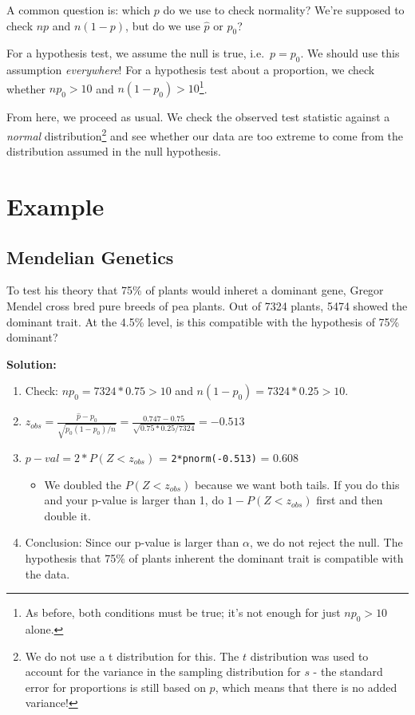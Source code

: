 \documentclass[
  letterpaper,
  DIV=11,
  numbers=noendperiod,
  oneside]{scrreprt}
\providecommand{\tightlist}{%
  \setlength{\itemsep}{0pt}\setlength{\parskip}{0pt}}\usepackage{longtable,booktabs,array}
\begin{document}
A common question is: which \(p\) do we use to check normality? We're
supposed to check \(np\) and \(n(1-p)\), but do we use \(\hat p\) or
\(p_0\)?

For a hypothesis test, we assume the null is true, i.e.~\(p=p_0\). We
should use this assumption \emph{everywhere}! For a hypothesis test
about a proportion, we check whether \(np_0>10\) and
\(n(1-p_0)>10\)\footnote{As before, both conditions must be true; it's
  not enough for just \(np_0>10\) alone.}.

From here, we proceed as usual. We check the observed test statistic
against a \emph{normal} distribution\footnote{We do not use a t
  distribution for this. The \(t\) distribution was used to account for
  the variance in the sampling distribution for \(s\) - the standard
  error for proportions is still based on \(p\), which means that there
  is no added variance!} and see whether our data are too extreme to
come from the distribution assumed in the null hypothesis.

\hypertarget{example-4}{%
\section{Example}\label{example-4}}

\hypertarget{mendelian-genetics}{%
\subsection{Mendelian Genetics}\label{mendelian-genetics}}

To test his theory that 75\% of plants would inheret a dominant gene,
Gregor Mendel cross bred pure breeds of pea plants. Out of 7324 plants,
5474 showed the dominant trait. At the 4.5\% level, is this compatible
with the hypothesis of 75\% dominant?

\textbf{Solution:}

\begin{enumerate}
\def\labelenumi{\arabic{enumi}.}
\tightlist
\item
  Check: \(np_0 = 7324*0.75 > 10\) and \(n(1-p_0) = 7324*0.25 > 10\).
\item
  \(z_{obs} = \frac{\hat p - p_0}{\sqrt{p_0(1-p_0)/n}} = \frac{0.747 - 0.75}{\sqrt{0.75*0.25/7324}} = -0.513\)
\item
  \(p-val = 2 *P(Z < z_{obs})\) = \texttt{2*pnorm(-0.513)} = 0.608

  \begin{itemize}
  \tightlist
  \item
    We doubled the \(P(Z < z_{obs})\) because we want both tails. If you
    do this and your p-value is larger than 1, do \(1 - P(Z < z_{obs})\)
    first and then double it.
  \end{itemize}
\item
  Conclusion: Since our p-value is larger than \(\alpha\), we do not
  reject the null. The hypothesis that 75\% of plants inherent the
  dominant trait is compatible with the data.
\end{enumerate}
\end{document}
